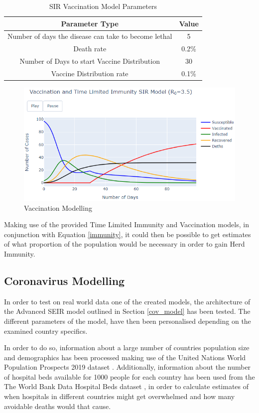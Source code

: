 {
\begin{table}[h!]
\centering
\begin{tabular}{|c|c|}
\hline
Parameter Type & Value \\
\hline
Number of days the disease can take to become lethal & 5  \\
Death rate & 0.2\%  \\
Number of Days to start Vaccine Distribution & 30  \\
Vaccine Distribution rate & 0.1\%  \\
\hline
\end{tabular}
\caption{SIR Vaccination Model Parameters}
\label{table:2}
\end{table}
}

\begin{figure}[ht!]%
    \centering
    \includegraphics[width=13cm]{latex/images/vacc.PNG}%
    \caption{Vaccination Modelling}
    \label{vacc}
\end{figure}

Making use of the provided Time Limited Immunity and Vaccination models, in conjunction with Equation \ref{immunity}, it could then be possible to get estimates of what proportion of the population would be necessary in order to gain Herd Immunity. 

\subsection{Coronavirus Modelling}
In order to test on real world data one of the created models, the architecture of the Advanced SEIR model outlined in Section \ref{cov_model} has been tested. The different parameters of the model, have then been personalised depending on the examined country specifics.

In order to do so, information about a large number of countries population size and demographics has been processed making use of the United Nations World Population Prospects 2019 dataset \cite{pop_data}. Additionally, information about the number of hospital beds available for 1000 people for each country has been used from the The World Bank Data Hospital Beds dataset \cite{beds_data}, in order to calculate estimates of when hospitals in different countries might get overwhelmed and how many avoidable deaths would that cause.

